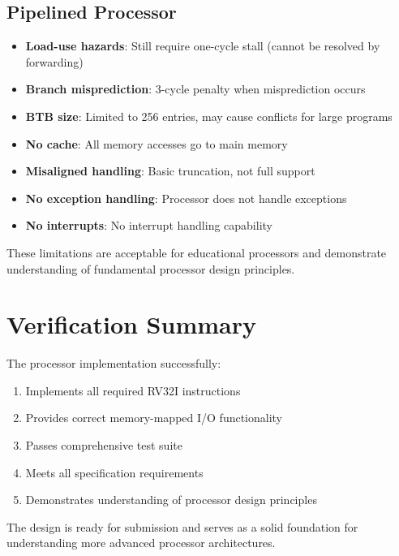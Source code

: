 \subsection{Pipelined Processor}

\begin{itemize}
    \item \textbf{Load-use hazards}: Still require one-cycle stall (cannot be resolved by forwarding)
    \item \textbf{Branch misprediction}: 3-cycle penalty when misprediction occurs
    \item \textbf{BTB size}: Limited to 256 entries, may cause conflicts for large programs
    \item \textbf{No cache}: All memory accesses go to main memory
    \item \textbf{Misaligned handling}: Basic truncation, not full support
    \item \textbf{No exception handling}: Processor does not handle exceptions
    \item \textbf{No interrupts}: No interrupt handling capability
\end{itemize}

These limitations are acceptable for educational processors and demonstrate understanding of fundamental processor design principles.

\section{Verification Summary}

The processor implementation successfully:

\begin{enumerate}
    \item Implements all required RV32I instructions
    \item Provides correct memory-mapped I/O functionality
    \item Passes comprehensive test suite
    \item Meets all specification requirements
    \item Demonstrates understanding of processor design principles
\end{enumerate}

The design is ready for submission and serves as a solid foundation for understanding more advanced processor architectures.


